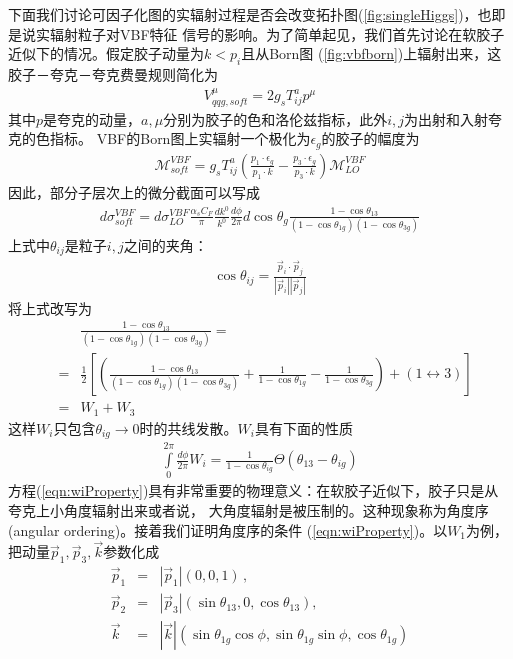 下面我们讨论可因子化图的实辐射过程是否会改变拓扑图(\ref{fig:singleHiggs})，也即是说实辐射粒子对VBF特征
信号的影响。为了简单起见，我们首先讨论在软胶子近似下的情况。假定胶子动量为$k < p_i$且从Born图
(\ref{fig:vbfborn})上辐射出来，这胶子－夸克－夸克费曼规则简化为
\begin{eqnarray}
V^{\mu}_{qqg,soft} = 2g_s T^a_{ij} p^{\mu}
\end{eqnarray}
其中$p$是夸克的动量，$a,\mu$分别为胶子的色和洛伦兹指标，此外$i,j$为出射和入射夸克的色指标。
VBF的Born图上实辐射一个极化为$\epsilon_g$的胶子的幅度为
\begin{eqnarray}
\mathcal{M}^{VBF}_{soft} = g_s T^a_{ij}\left(\frac{p_1\cdot \epsilon_g}{p_1\cdot k} -
\frac{p_3\cdot\epsilon_g}{p_3\cdot k} \right)\mathcal{M}^{VBF}_{LO}
\end{eqnarray}
因此，部分子层次上的微分截面可以写成
\begin{eqnarray}
d\sigma^{VBF}_{soft} = d\sigma^{VBF}_{LO} \frac{\alpha_s C_F}{\pi}\frac{dk^0}{k^0}\frac{d\phi}{2\pi}
d\cos\theta_g\frac{1-\cos\theta_{13}}{(1-\cos\theta_{1g})(1-\cos\theta_{3g})}
\end{eqnarray}
上式中$\theta_{ij}$是粒子$i,j$之间的夹角：
\begin{eqnarray}
\cos\theta_{ij} = \frac{\vec{p}_i\cdot \vec{p}_j}{|\vec{p}_i||\vec{p}_j|}
\end{eqnarray}
将上式改写为
\begin{eqnarray}
&& \frac{1-\cos\theta_{13}}{(1-\cos\theta_{1g})(1-\cos\theta_{3g})} = \nonumber \\
&=& \frac{1}{2}\left[\left(\frac{1-\cos\theta_{13}}{(1-\cos\theta_{1g})(1-\cos\theta_{3g})} +
\frac{1}{1-\cos\theta_{1g}} - \frac{1}{1-\cos\theta_{3g}}
\right) + (1\leftrightarrow3)\right] \nonumber \\
&=& W_1 + W_3
\end{eqnarray}
这样$W_i$只包含$\theta_{ig}\to 0$时的共线发散。$W_i$具有下面的性质
\begin{eqnarray}
\int\limits^{2\pi}_{0} \frac{d\phi}{2\pi} W_i = \frac{1}{1-\cos\theta_{ig}}\Theta(\theta_{13}-\theta_{ig})
\label{eqn:wiProperty}
\end{eqnarray}
方程(\ref{eqn:wiProperty})具有非常重要的物理意义：在软胶子近似下，胶子只是从夸克上小角度辐射出来或者说，
大角度辐射是被压制的。这种现象称为角度序(angular ordering)。接着我们证明角度序的条件
(\ref{eqn:wiProperty})。以$W_1$为例，把动量$\vec{p}_1,\vec{p}_3,\vec{k}$参数化成
\begin{eqnarray}
\vec{p}_1 &=& |\vec{p}_1|(0, 0, 1)\,, \nonumber \\
\vec{p}_2 &=& |\vec{p}_3|(\sin\theta_{13}, 0, \cos\theta_{13}), \nonumber \\
\vec{k}   &=& |\vec{k}| (\sin\theta_{1g}\cos\phi, \sin\theta_{1g}\sin\phi, \cos\theta_{1g}) 
\end{eqnarray}
